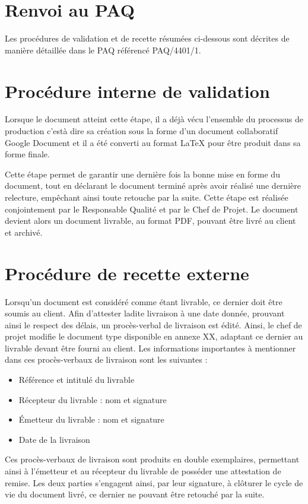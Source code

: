 
\section{Renvoi au PAQ}

Les procédures de validation et de recette résumées ci-dessous sont décrites de manière détaillée dans le PAQ référencé PAQ/4401/1.

\section{Procédure interne de validation}

Lorsque le document atteint cette étape, il a déjà vécu l'ensemble du processus de production c'està dire sa création sous la forme d'un document collaboratif Google Document et il a été converti au format LaTeX pour être produit dans sa forme finale. 

Cette étape permet de garantir une dernière fois la bonne mise en forme du document, tout en déclarant le document terminé après avoir réalisé une dernière relecture, empêchant ainsi toute retouche par la suite. Cette étape est réalisée conjointement par le Responsable Qualité et par le Chef de Projet. Le document devient alors un document livrable, au format PDF, pouvant être livré au client et archivé.

\section{Procédure de recette externe}

Lorsqu’un document est considéré comme étant livrable, ce dernier doit être soumis au client. Afin d’attester ladite livraison à une date donnée, prouvant ainsi le respect des délais, un procès-verbal de livraison est édité. Ainsi, le chef de projet modifie le document type disponible en annexe XX, adaptant ce dernier au livrable devant être fourni au client. Les informations importantes à mentionner dans ces procès-verbaux de livraison sont les suivantes : \\

\begin{itemize}
    \item[\textbullet] Référence et intitulé du livrable
    \item[\textbullet] Récepteur du livrable : nom et signature
    \item[\textbullet] Émetteur du livrable : nom et signature
    \item[\textbullet] Date de la livraison \\
\end{itemize}
    
Ces procès-verbaux de livraison sont produits en double exemplaires, permettant ainsi à l’émetteur et au récepteur du livrable de posséder une attestation de remise. Les deux parties s’engagent ainsi, par leur signature, à clôturer le cycle de vie du document livré, ce dernier ne pouvant être retouché par la suite.
